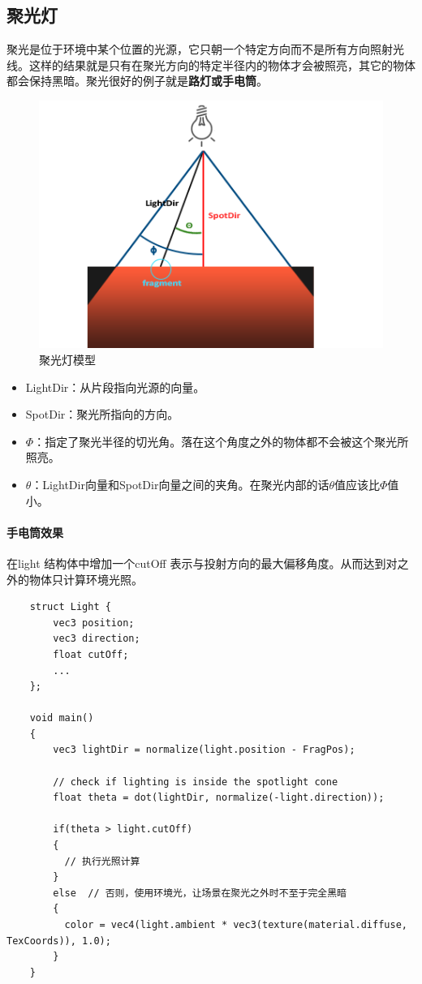 \documentclass[UTF8,a4paper,12pt]{ctexbook}
\begin{document}
		\subsection{聚光灯}
			聚光是位于环境中某个位置的光源，它只朝一个特定方向而不是所有方向照射光线。这样的结果就是只有在聚光方向的特定半径内的物体才会被照亮，其它的物体都会保持黑暗。聚光很好的例子就是\textbf{路灯或手电筒}。
			
			\begin{figure}[H]
				\centering
				\includegraphics[width=.83\linewidth]{light_casters_spotlight_angles}
				\caption{聚光灯模型}
			\end{figure}
			
			\begin{itemize}
				\item LightDir：从片段指向光源的向量。
				\item SpotDir：聚光所指向的方向。
				\item $\Phi$：指定了聚光半径的切光角。落在这个角度之外的物体都不会被这个聚光所照亮。
				\item $\theta$：LightDir向量和SpotDir向量之间的夹角。在聚光内部的话$\theta$值应该比$\Phi$值小。
			\end{itemize}
			
			
			\paragraph{手电筒效果}
				在light 结构体中增加一个cutOff 表示与投射方向的最大偏移角度。从而达到对之外的物体只计算环境光照。
				
				\begin{lstlisting}
	struct Light {
	    vec3 position;  
	    vec3 direction;
	    float cutOff;
	    ...
	};
	
	void main()
	{
	    vec3 lightDir = normalize(light.position - FragPos);
	    
	    // check if lighting is inside the spotlight cone
	    float theta = dot(lightDir, normalize(-light.direction)); 
	    
		if(theta > light.cutOff) 
		{       
		  // 执行光照计算
		}
		else  // 否则，使用环境光，让场景在聚光之外时不至于完全黑暗
		{
		  color = vec4(light.ambient * vec3(texture(material.diffuse, TexCoords)), 1.0);
		}
	} 				
				\end{lstlisting}
			
\end{document}
